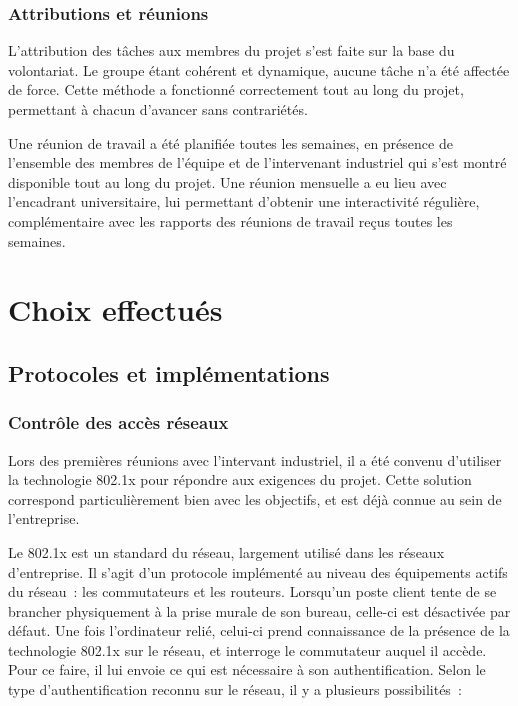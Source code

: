 \subsubsection{Attributions et réunions}

L'attribution des tâches aux membres du projet s'est faite sur la base du volontariat. Le groupe étant cohérent et dynamique, aucune tâche n'a été affectée de force. Cette méthode a fonctionné correctement tout au long du projet, permettant à chacun d'avancer sans contrariétés.

Une réunion de travail a été planifiée toutes les semaines, en présence de l'ensemble des membres de l'équipe et de l'intervenant industriel qui s'est montré disponible tout au long du projet. Une réunion mensuelle a eu lieu avec l'encadrant universitaire, lui permettant d'obtenir une interactivité régulière, complémentaire avec les rapports des réunions de travail reçus toutes les semaines.

\section{Choix effectués}
\subsection{Protocoles et implémentations}
\subsubsection{Contrôle des accès réseaux}

Lors des premières réunions avec l'intervant industriel, il a été convenu d'utiliser la technologie 802.1x pour répondre aux exigences du projet. Cette solution correspond particulièrement bien avec les objectifs, et est déjà connue au sein de l'entreprise.

Le 802.1x est un standard du réseau, largement utilisé dans les réseaux d'entreprise. Il s'agit d'un protocole implémenté au niveau des équipements actifs du réseau~: les commutateurs et les routeurs. Lorsqu'un poste client tente de se brancher physiquement à la prise murale de son bureau, celle-ci est désactivée par défaut. Une fois l'ordinateur relié, celui-ci prend connaissance de la présence de la technologie 802.1x sur le réseau, et interroge le commutateur auquel il accède. Pour ce faire, il lui envoie ce qui est nécessaire à son authentification. Selon le type d'authentification reconnu sur le réseau, il y a plusieurs possibilités~:

